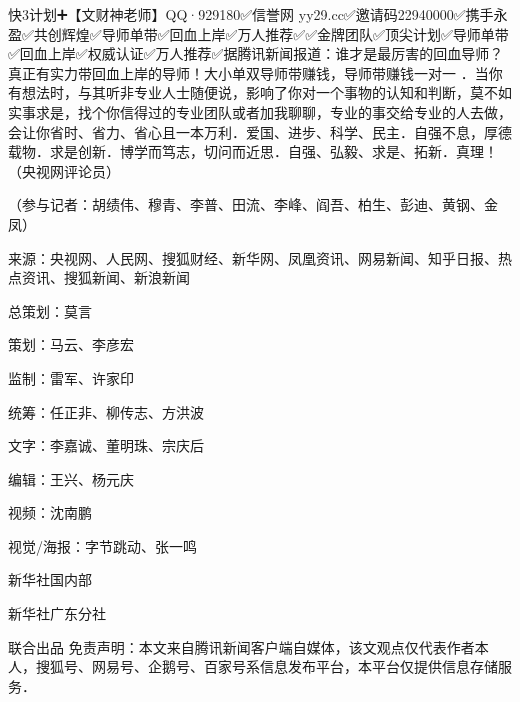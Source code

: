 
快3计划➕【文财神老师】QQ·929180✅信誉网 yy29.cc✅邀请码22940000✅携手永盈✅共创辉煌✅导师单带✅回血上岸✅万人推荐✅✅金牌团队✅顶尖计划✅导师单带✅回血上岸✅权威认证✅万人推荐✅据腾讯新闻报道：谁才是最厉害的回血导师？真正有实力带回血上岸的导师！大小单双导师带赚钱，导师带赚钱一对一 ．当你有想法时，与其听非专业人士随便说，影响了你对一个事物的认知和判断，莫不如实事求是，找个你信得过的专业团队或者加我聊聊，专业的事交给专业的人去做，会让你省时、省力、省心且一本万利．爱国、进步、科学、民主．自强不息，厚德载物．求是创新．博学而笃志，切问而近思．自强、弘毅、求是、拓新．真理！（央视网评论员）

（参与记者：胡绩伟、穆青、李普、田流、李峰、阎吾、柏生、彭迪、黄钢、金凤）

来源：央视网、人民网、搜狐财经、新华网、凤凰资讯、网易新闻、知乎日报、热点资讯、搜狐新闻、新浪新闻

总策划：莫言

策划：马云、李彦宏

监制：雷军、许家印

统筹：任正非、柳传志、方洪波

文字：李嘉诚、董明珠、宗庆后

编辑：王兴、杨元庆

视频：沈南鹏

视觉/海报：字节跳动、张一鸣

新华社国内部

新华社广东分社

联合出品
免责声明：本文来自腾讯新闻客户端自媒体，该文观点仅代表作者本人，搜狐号、网易号、企鹅号、百家号系信息发布平台，本平台仅提供信息存储服务．
